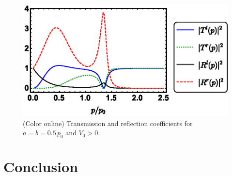 \begin{figure}[t]
\begin{center}
	\includegraphics[width=\linewidth]{Figures/IVSymTR.eps}
\end{center}
\caption{(Color online) Transmission and reflection coefficients for $a=b=0.5\, p_0$ and $V_0>0$.}
\label{fig:T_R_fig2}
\end{figure}



%

\section{Conclusion}
\label{sec:RealEigenConclusions}

